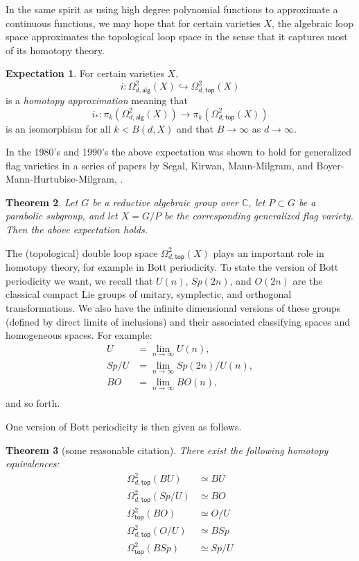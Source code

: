\documentclass{amsart}
\newtheorem{theorem}{Theorem}[section]
\theoremstyle{definition}
\newtheorem{expectation}[theorem]{Expectation}
\newcommand{\CC} {{\mathbb C}}          %
\newcommand{\alg}{\mathsf{alg}}
\renewcommand{\top}{\mathsf{top}}
\newcommand{\LoopTwo}{\Omega^{2}_{d,\alg}}
\newcommand{\LoopTwoTop}{\Omega^{2}_{d,\top}}
\newcommand{\NoDLoopTwoTop}{\Omega^{2}_{\top}}
\newcommand{\homotopyeq}{\simeq}
\begin{document}
In the same spirit as using high degree polynomial functions to
approximate a continuous functions, we may hope that for certain
varieties $X$, the algebraic loop space approximates the topological
loop space in the sense that it captures most of its homotopy theory.

\begin{expectation}
For certain varieties $X$, 
\[
i:\LoopTwo (X) \hookrightarrow \LoopTwoTop
(X)
\]
is a \emph{homotopy approximation} meaning that 
\[
i_{*}:\pi_{k}(\LoopTwo (X)) \to \pi_{k}( \LoopTwoTop (X))
\]
is an isomorphism for all $k<B(d,X)$ and that $B\to \infty $ as $d\to
\infty$. 
\end{expectation}

In the 1980's and 1990's the above expectation was shown to hold for
generalized flag varieties in a series of papers by Segal, Kirwan,
Mann-Milgram, and Boyer-Mann-Hurtubise-Milgram,
\cite{Segal-1979,Kirwan-1986,Mann-Milgram-93,Boyer-Mann-Hurtubise-Milgram}.

\begin{theorem}\label{thm: Mann-Milgram algebraic loop approximation
holds for generalized flag varieties}
Let $G$ be a reductive algebraic group over $\CC$, let $P\subset G$
be a parabolic subgroup, and let $X=G/P$ be the corresponding
generalized flag variety. Then the above expectation holds.
\end{theorem}

The (topological) double loop space $\LoopTwoTop (X)$ plays an
important role in homotopy theory, for example in Bott periodicity. To
state the version of Bott periodicity we want, we recall that $U(n)$,
$Sp(2n)$, and $O(2n)$ are the classical compact Lie groups of unitary,
symplectic, and orthogonal transformations. We also have the infinite
dimensional versions of these groups (defined by direct limits of
inclusions) and their associated classifying spaces and homogeneous
spaces. For example:
\begin{align*}
U&=\lim_{n\to  \infty} U(n),\\
Sp/U& = \lim_{n\to  \infty} Sp(2n)/U(n),\\
BO& = \lim_{n\to  \infty} BO(n),\\
\end{align*}
and so forth.

One version of Bott periodicity is then given as follows.

\begin{theorem}[{\color{red}some reasonable citation}]\label{thm: classical Bott periodicity as homotopy equivalences}
There exist the following homotopy equivalences:
\begin{align}
\LoopTwoTop (BU)&\homotopyeq BU \label{eqn: Omega2BU=BU}\\
\LoopTwoTop (Sp/U)&\homotopyeq BO  \label{eqn: Omega2Sp/U=BO}\\
\NoDLoopTwoTop (BO)&\homotopyeq O/U  \label{eqn: Omega2BO=O/U}\\
\LoopTwoTop (O/U)&\homotopyeq BSp  \label{eqn: Omega2O/U=BSp}\\
\NoDLoopTwoTop (BSp)&\homotopyeq Sp/U   \label{eqn: Omega2BSp=Sp/U}
\end{align}
\end{theorem}
\end{document}
